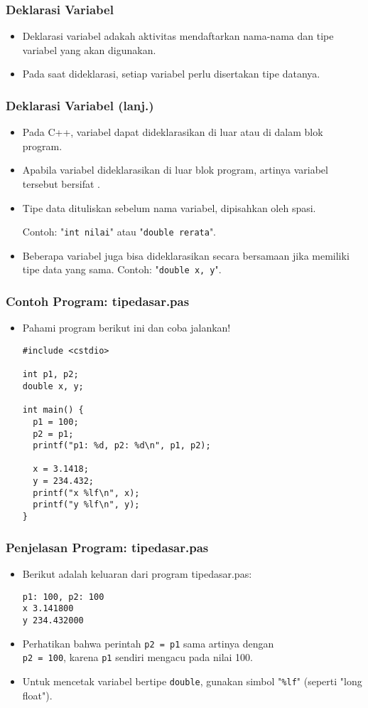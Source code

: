 \begin{frame}
\frametitle{Deklarasi Variabel}
\begin{itemize}
  \item Deklarasi variabel adakah aktivitas mendaftarkan nama-nama dan tipe variabel yang akan digunakan.
  \item Pada saat dideklarasi, setiap variabel perlu disertakan tipe datanya.
\end{itemize}
\end{frame}

\begin{frame}
\frametitle{Deklarasi Variabel (lanj.)}
\begin{itemize}
  \item Pada C++, variabel dapat dideklarasikan di luar atau di dalam blok program.
  \item Apabila variabel dideklarasikan di luar blok program, artinya variabel tersebut bersifat .
  \item Tipe data dituliskan sebelum nama variabel, dipisahkan oleh spasi.

  Contoh: "\texttt{int nilai}" atau "\texttt{double rerata}".
  \item Beberapa variabel juga bisa dideklarasikan secara bersamaan jika memiliki tipe data yang sama. Contoh: "\texttt{double x, y}".
\end{itemize}
\end{frame}


\begin{frame}[fragile]
\frametitle{Contoh Program: tipedasar.pas}
\begin{itemize}
  \item Pahami program berikut ini dan coba jalankan!
\begin{lstlisting}
#include <cstdio>

int p1, p2;
double x, y;

int main() {
  p1 = 100;
  p2 = p1;
  printf("p1: %d, p2: %d\n", p1, p2);

  x = 3.1418;
  y = 234.432;
  printf("x %lf\n", x);
  printf("y %lf\n", y);
}
\end{lstlisting}
\end{itemize}
\end{frame}

\begin{frame}[fragile]
\frametitle{Penjelasan Program: tipedasar.pas}
\begin{itemize}
  \item Berikut adalah keluaran dari program tipedasar.pas:
\begin{lstlisting}
p1: 100, p2: 100
x 3.141800
y 234.432000
\end{lstlisting}
  \item Perhatikan bahwa perintah \texttt{p2 = p1} sama artinya dengan \\ \texttt{p2 = 100}, karena \texttt{p1} sendiri mengacu pada nilai 100.
  \item Untuk mencetak variabel bertipe \texttt{double}, gunakan simbol "\texttt{\%lf}" (seperti "long float").
\end{itemize}
\end{frame}

